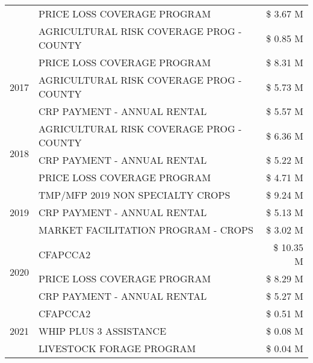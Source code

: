 \begin{tabular}{llr}
 & PRICE LOSS COVERAGE PROGRAM & \$ 3.67 M \\
 & AGRICULTURAL RISK COVERAGE PROG - COUNTY & \$ 0.85 M \\
\cline{1-3}
\multirow[t]{3}{*}{2017} & PRICE LOSS COVERAGE PROGRAM & \$ 8.31 M \\
 & AGRICULTURAL RISK COVERAGE PROG - COUNTY & \$ 5.73 M \\
 & CRP PAYMENT - ANNUAL RENTAL & \$ 5.57 M \\
\cline{1-3}
\multirow[t]{3}{*}{2018} & AGRICULTURAL RISK COVERAGE PROG - COUNTY & \$ 6.36 M \\
 & CRP PAYMENT - ANNUAL RENTAL & \$ 5.22 M \\
 & PRICE LOSS COVERAGE PROGRAM & \$ 4.71 M \\
\cline{1-3}
\multirow[t]{3}{*}{2019} & TMP/MFP 2019 NON SPECIALTY CROPS & \$ 9.24 M \\
 & CRP PAYMENT - ANNUAL RENTAL & \$ 5.13 M \\
 & MARKET FACILITATION PROGRAM - CROPS & \$ 3.02 M \\
\cline{1-3}
\multirow[t]{3}{*}{2020} & CFAPCCA2 & \$ 10.35 M \\
 & PRICE LOSS COVERAGE PROGRAM & \$ 8.29 M \\
 & CRP PAYMENT - ANNUAL RENTAL & \$ 5.27 M \\
\cline{1-3}
\multirow[t]{3}{*}{2021} & CFAPCCA2 & \$ 0.51 M \\
 & WHIP PLUS 3 ASSISTANCE & \$ 0.08 M \\
 & LIVESTOCK FORAGE PROGRAM & \$ 0.04 M \\
\cline{1-3}
\bottomrule
\end{tabular}

